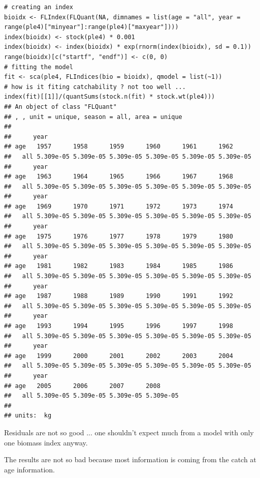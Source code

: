 \documentclass[a4paper,english,10pt]{article}\usepackage[]{graphicx}\usepackage[]{color}
\makeatletter
\newenvironment{kframe}{%
 \def\at@end@of@kframe{}%
 \ifinner\ifhmode%
  \def\at@end@of@kframe{\end{minipage}}%
  \begin{minipage}{\columnwidth}%
 \fi\fi%
 \def\FrameCommand##1{\hskip\@totalleftmargin \hskip-\fboxsep
 \colorbox{shadecolor}{##1}\hskip-\fboxsep
     \hskip-\linewidth \hskip-\@totalleftmargin \hskip\columnwidth}%
 \MakeFramed {\advance\hsize-\width
   \@totalleftmargin\z@ \linewidth\hsize
   \@setminipage}}%
 {\par\unskip\endMakeFramed%
 \at@end@of@kframe}
\newenvironment{knitrout}{}{} %
\makeatother
\begin{document}
\begin{knitrout}
\color{fgcolor}\begin{kframe}
\begin{verbatim}
# creating an index
bioidx <- FLIndex(FLQuant(NA, dimnames = list(age = "all", year = range(ple4)["minyear"]:range(ple4)["maxyear"])))
index(bioidx) <- stock(ple4) * 0.001
index(bioidx) <- index(bioidx) * exp(rnorm(index(bioidx), sd = 0.1))
range(bioidx)[c("startf", "endf")] <- c(0, 0)
# fitting the model
fit <- sca(ple4, FLIndices(bio = bioidx), qmodel = list(~1))
# how is it fiting catchability ? not too well ...
index(fit)[[1]]/(quantSums(stock.n(fit) * stock.wt(ple4)))
## An object of class "FLQuant"
## , , unit = unique, season = all, area = unique
## 
##      year
## age   1957      1958      1959      1960      1961      1962     
##   all 5.309e-05 5.309e-05 5.309e-05 5.309e-05 5.309e-05 5.309e-05
##      year
## age   1963      1964      1965      1966      1967      1968     
##   all 5.309e-05 5.309e-05 5.309e-05 5.309e-05 5.309e-05 5.309e-05
##      year
## age   1969      1970      1971      1972      1973      1974     
##   all 5.309e-05 5.309e-05 5.309e-05 5.309e-05 5.309e-05 5.309e-05
##      year
## age   1975      1976      1977      1978      1979      1980     
##   all 5.309e-05 5.309e-05 5.309e-05 5.309e-05 5.309e-05 5.309e-05
##      year
## age   1981      1982      1983      1984      1985      1986     
##   all 5.309e-05 5.309e-05 5.309e-05 5.309e-05 5.309e-05 5.309e-05
##      year
## age   1987      1988      1989      1990      1991      1992     
##   all 5.309e-05 5.309e-05 5.309e-05 5.309e-05 5.309e-05 5.309e-05
##      year
## age   1993      1994      1995      1996      1997      1998     
##   all 5.309e-05 5.309e-05 5.309e-05 5.309e-05 5.309e-05 5.309e-05
##      year
## age   1999      2000      2001      2002      2003      2004     
##   all 5.309e-05 5.309e-05 5.309e-05 5.309e-05 5.309e-05 5.309e-05
##      year
## age   2005      2006      2007      2008     
##   all 5.309e-05 5.309e-05 5.309e-05 5.309e-05
## 
## units:  kg
\end{verbatim}
\end{kframe}
\end{knitrout}


Residuals are not so good ... one shouldn't expect much from a model with only one biomass index anyway. 


The results are not so bad because most information is coming from the catch at age information.
\end{document}
